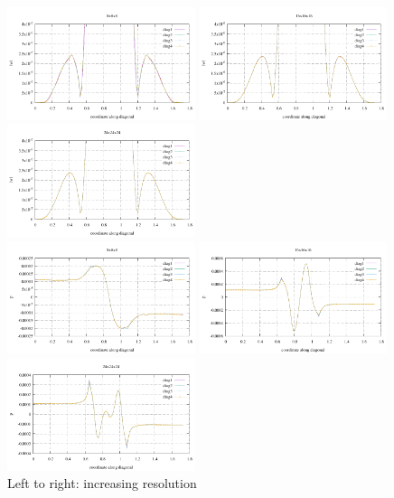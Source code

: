 \begin{center}
\includegraphics[width=5.5cm]{python_codes/fieldstone_82/results/bench4/w_08}
\includegraphics[width=5.5cm]{python_codes/fieldstone_82/results/bench4/w_16}
\includegraphics[width=5.5cm]{python_codes/fieldstone_82/results/bench4/w_24}\\
\includegraphics[width=5.5cm]{python_codes/fieldstone_82/results/bench4/p_08}
\includegraphics[width=5.5cm]{python_codes/fieldstone_82/results/bench4/p_16}
\includegraphics[width=5.5cm]{python_codes/fieldstone_82/results/bench4/p_24}\\
{\captionfont Left to right: increasing resolution}
\end{center}

